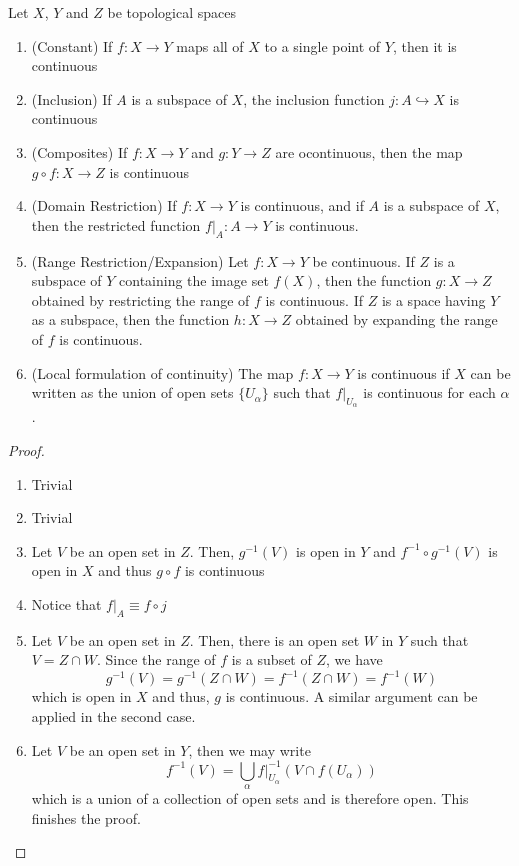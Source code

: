 \begin{theorem}
    Let $X$, $Y$ and $Z$ be topological spaces 
    \begin{enumerate}
        \item (Constant) If $f:X\to Y$ maps all of $X$ to a single point of $Y$, then it is continuous 
        \item (Inclusion) If $A$ is a subspace of $X$, the inclusion function $j:A\hookrightarrow X$ is continuous 
        \item (Composites) If $f:X\to Y$ and $g:Y\to Z$ are ocontinuous, then the map $g\circ f: X\to Z$ is continuous
        \item (Domain Restriction) If $f:X\to Y$ is continuous, and if $A$ is a subspace of $X$, then the restricted function $f|_A:A\to Y$ is continuous.
        \item (Range Restriction/Expansion) Let $f:X\to Y$ be continuous. If $Z$ is a subspace of $Y$ containing the image set $f(X)$, then the function $g:X\to Z$ obtained by restricting the range of $f$ is continuous. If $Z$ is a space having $Y$ as a subspace, then the function $h:X\to Z$ obtained by expanding the range of $f$ is continuous.
        \item (Local formulation of continuity) The map $f:X\to Y$ is continuous if $X$ can be written as the union of open sets $\{U_\alpha\}$ such that $f|_{U_\alpha}$ is continuous for each $\alpha$.
    \end{enumerate}
\end{theorem}
\begin{proof}
    \hfill 
    \begin{enumerate}
        \item Trivial
        \item Trivial
        \item Let $V$ be an open set in $Z$. Then, $g^{-1}(V)$ is open in $Y$ and $f^{-1}\circ g^{-1}(V)$ is open in $X$ and thus $g\circ f$ is continuous
        \item Notice that $f|_A\equiv f\circ j$
        \item Let $V$ be an open set in $Z$. Then, there is an open set $W$ in $Y$ such that $V = Z\cap W$. Since the range of $f$ is a subset of $Z$, we have
        \begin{equation*}
            g^{-1}(V) = g^{-1}(Z\cap W) = f^{-1}(Z\cap W) = f^{-1}(W)
        \end{equation*}
        which is open in $X$ and thus, $g$ is continuous. A similar argument can be applied in the second case.
        \item Let $V$ be an open set in $Y$, then we may write 
        \begin{equation*}
            f^{-1}(V) = \bigcup_{\alpha}f|_{U_\alpha}^{-1}(V\cap f(U_\alpha))
        \end{equation*}
        which is a union of a collection of open sets and is therefore open. This finishes the proof.
    \end{enumerate}
\end{proof}

